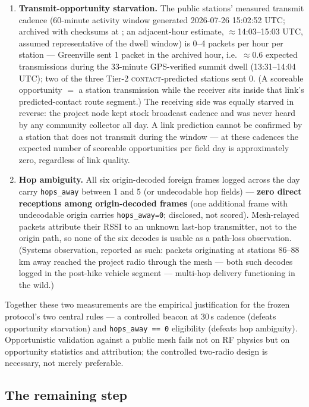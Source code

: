 \documentclass[11pt]{article}
\newcommand{\code}[1]{\texttt{\small #1}}
\begin{document}
\begin{enumerate}
\item \textbf{Transmit-opportunity starvation.} The public stations' measured transmit cadence (60-minute activity window generated 2026-07-26 15:02:52 UTC; archived with checksums at ; an adjacent-hour estimate, ${\approx}$14:03--15:03 UTC, assumed representative of the dwell window) is 0--4 packets per hour per station --- Greenville sent 1 packet in the archived hour, i.e.\ ${\approx}0.6$ expected transmissions during the 33-minute GPS-verified summit dwell (13:31--14:04 UTC); two of the three Tier-2 \textsc{contact}-predicted stations sent 0. (A scoreable opportunity $=$ a station transmission while the receiver sits inside that link's predicted-contact route segment.) The receiving side was equally starved in reverse: the project node
kept stock broadcast cadence and was never heard by any community collector
all day. A link prediction cannot be confirmed by a station that does not
transmit during the window --- at these cadences the expected number of
scoreable opportunities per field day is approximately zero, regardless of
link quality.
\item \textbf{Hop ambiguity.} All six origin-decoded foreign frames logged across the day carry \code{hops\_away} between 1 and 5 (or undecodable hop fields) --- \textbf{zero direct receptions among origin-decoded frames} (one additional frame with undecodable origin carries \code{hops\_away=0}; disclosed, not scored). Mesh-relayed packets attribute their RSSI to an unknown
last-hop transmitter, not to the origin path, so none of the six decodes is
usable as a path-loss observation. (Systems observation, reported as such:
packets originating at stations 86--88\,km away reached the project radio through the mesh --- both such decodes logged in the post-hike vehicle segment --- multi-hop delivery functioning in the wild.)
\end{enumerate}

Together these two measurements are the empirical justification for the
frozen protocol's two central rules --- a controlled beacon at 30\,s cadence
(defeats opportunity starvation) and \code{hops\_away == 0} eligibility
(defeats hop ambiguity). Opportunistic validation against a public mesh fails
not on RF physics but on opportunity statistics and attribution; the
controlled two-radio design is necessary, not merely preferable.

\subsection{The remaining step}
\end{document}
